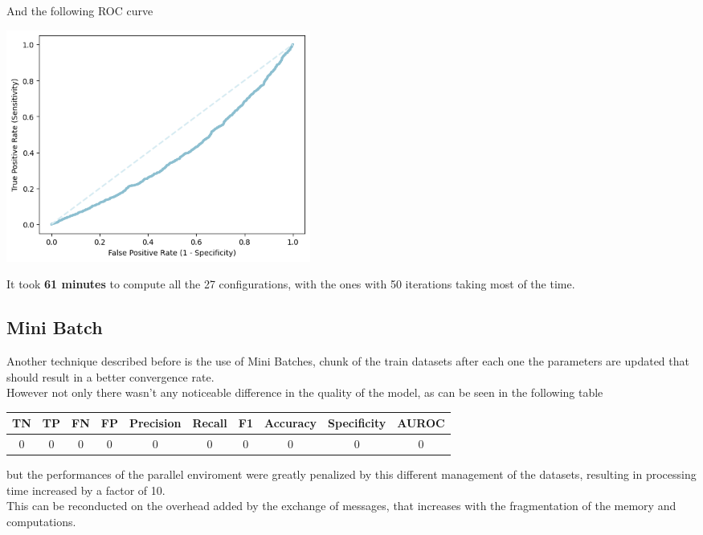 \documentclass[
	letterpaper, %
	10pt, %
]{class}
\begin{document}
And the following ROC curve

\begin{center}
    \includegraphics[width=10cm]{../images/parallel_roc.png}
\end{center}

It took \textbf{61 minutes} to compute all the 27 configurations, with the ones with 50 iterations taking most of the time.

\subsection{Mini Batch}

Another technique described before is the use of Mini Batches, chunk of the train datasets after each one the parameters are updated that should result in a better convergence rate.\\
However not only there wasn't any noticeable difference in the quality of the model, as can be seen in the following table

\begin{center}
    \begin{tabular}{ |c|c|c|c|c|c|c|c|c|c| }
        \hline
        TN & TP & FN & FP & Precision & Recall & F1 & Accuracy & Specificity & AUROC \\
        \hline
        0  & 0  & 0  & 0  & 0         & 0      & 0  & 0        & 0           & 0     \\
        \hline
    \end{tabular}
\end{center}

but the performances of the parallel enviroment were greatly penalized by this different management of the datasets, resulting in processing time increased by a factor of 10.\\
This can be reconducted on the overhead added by the exchange of messages, that increases with the fragmentation of the memory and computations.
\end{document}
